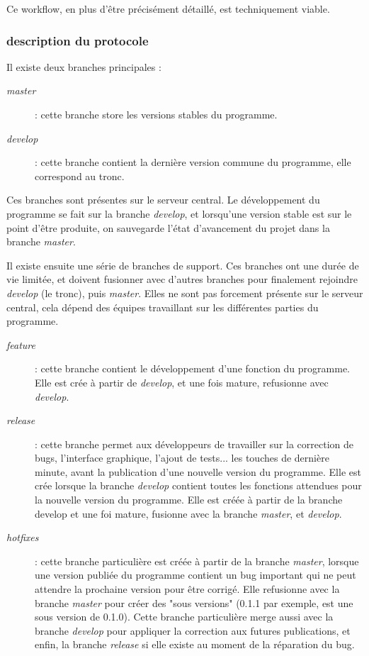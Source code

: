 Ce workflow, en plus d'être précisément détaillé, est techniquement viable.

\subsubsection{description du protocole}

Il existe deux branches principales : 
\begin{description}
  \item[\emph{master}] : cette branche store les versions stables du programme.
  \item[\emph{develop}] : cette branche contient la dernière version commune du programme, elle correspond au tronc.
\end{description}
Ces branches sont présentes sur le serveur central. Le développement du programme se fait sur la branche \emph{develop}, et lorsqu'une version stable est sur le point d'être produite, on sauvegarde l'état d'avancement du projet dans la branche \emph{master}.

Il existe ensuite une série de branches de support.
Ces branches ont une durée de vie limitée, et doivent fusionner avec d'autres branches pour finalement rejoindre \emph{develop} (le tronc), puis \emph{master}.
Elles ne sont pas forcement présente sur le serveur central, cela dépend des équipes travaillant sur les différentes parties du programme.
\begin{description}
  \item[\emph{feature}] : cette branche contient le développement d'une fonction du programme. Elle est crée à partir de \emph{develop}, et une fois mature, refusionne avec \emph{develop}.
  \item[\emph{release}] : cette branche permet aux développeurs de travailler sur la correction de bugs, l'interface graphique, l'ajout de tests... les touches de dernière minute, avant la publication d'une nouvelle version du programme. Elle est crée lorsque la branche \emph{develop} contient toutes les fonctions attendues pour la nouvelle version du programme. Elle est créée à partir de la branche develop et une foi mature, fusionne avec la branche \emph{master}, et \emph{develop}.
  \item[\emph{hotfixes}] : cette branche particulière est créée à partir de la branche \emph{master}, lorsque une version publiée du programme contient un bug important qui ne peut attendre la prochaine version pour être corrigé. Elle refusionne avec la branche \emph{master} pour créer des "sous versions" (0.1.1 par exemple, est une sous version de 0.1.0). Cette branche particulière merge aussi avec la branche \emph{develop} pour appliquer la correction aux futures publications, et enfin, la branche \emph{release} si elle existe au moment de la réparation du bug.
\end{description}

